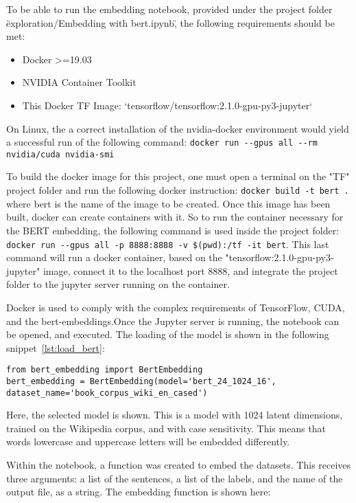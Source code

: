 To be able to run the embedding notebook, provided under the project folder \"exploration/Embedding with bert.ipynb\", the following requirements should be met:
\begin{itemize}
  \item Docker >=19.03
  \item NVIDIA Container Toolkit
  \item This Docker TF Image: `tensorflow/tensorflow:2.1.0-gpu-py3-jupyter`
\end{itemize}

On Linux, the a correct installation of the nvidia-docker environment would yield a successful run of the following command: \lstinline{docker run --gpus all --rm nvidia/cuda nvidia-smi}

To build the docker image for this project, one must open a terminal on the "TF" project folder and run the following docker instruction: \lstinline{docker build -t bert .} where bert is the name of the image to be created.
Once this image has been built, docker can create containers with it. So to run the container necessary for the BERT embedding, the following command is used inside the project folder: \lstinline{docker run --gpus all -p 8888:8888 -v $(pwd):/tf -it bert}.
This last command will run a docker container, based on the "tensorflow:2.1.0-gpu-py3-jupyter" image, connect it to the localhost port 8888, and integrate the project folder to the jupyter server running on the container.


Docker is used to comply with the complex requirements of TensorFlow, CUDA, and the bert-embeddings.Once the Jupyter server is running, the notebook can be opened, and executed. The loading of the model is shown in the following snippet~\ref{lst:load_bert}:

\begin{lstlisting}[caption={Loading BERT},label=lst:load_bert,frame=single]
from bert_embedding import BertEmbedding
bert_embedding = BertEmbedding(model='bert_24_1024_16', dataset_name='book_corpus_wiki_en_cased')
\end{lstlisting}

Here, the selected model is shown. This is a model with 1024 latent dimensions, trained on the Wikipedia corpus, and with case sensitivity. This means that words lowercase and uppercase letters will be embedded differently.

Within the notebook, a function was created to embed the datasets. This receives three arguments: a list of the sentences, a list of the labels, and the name of the output file, as a string. The embedding function is shown here:

